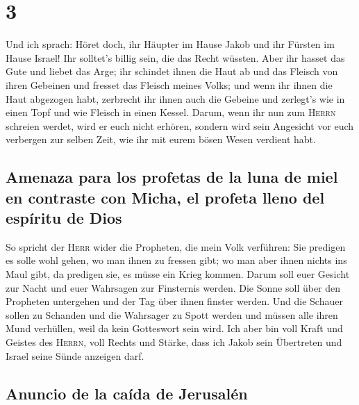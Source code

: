 \hypertarget{section-2}{%
\section{3}\label{section-2}}

 Und ich sprach: Höret doch, ihr Häupter im Hause Jakob
und ihr Fürsten im Hause Israel! Ihr solltet's billig sein, die das
Recht wüssten.  Aber ihr hasset das Gute und liebet das
Arge; ihr schindet ihnen die Haut ab und das Fleisch von ihren Gebeinen
 und fresset das Fleisch meines Volks; und wenn ihr ihnen
die Haut abgezogen habt, zerbrecht ihr ihnen auch die Gebeine und
zerlegt's wie in einen Topf und wie Fleisch in einen Kessel.
 Darum, wenn ihr nun zum \textsc{Herrn} schreien werdet,
wird er euch nicht erhören, sondern wird sein Angesicht vor euch
verbergen zur selben Zeit, wie ihr mit eurem bösen Wesen verdient habt.

\hypertarget{amenaza-para-los-profetas-de-la-luna-de-miel-en-contraste-con-micha-el-profeta-lleno-del-espuxedritu-de-dios}{%
\subsection{Amenaza para los profetas de la luna de miel en contraste
con Micha, el profeta lleno del espíritu de
Dios}\label{amenaza-para-los-profetas-de-la-luna-de-miel-en-contraste-con-micha-el-profeta-lleno-del-espuxedritu-de-dios}}

 So spricht der \textsc{Herr} wider die Propheten, die
mein Volk verführen: Sie predigen es solle wohl gehen, wo man ihnen zu
fressen gibt; wo man aber ihnen nichts ins Maul gibt, da predigen sie,
es müsse ein Krieg kommen.  Darum soll euer Gesicht zur
Nacht und euer Wahrsagen zur Finsternis werden. Die Sonne soll über den
Propheten untergehen und der Tag über ihnen finster werden.
 Und die Schauer sollen zu Schanden und die Wahrsager zu
Spott werden und müssen alle ihren Mund verhüllen, weil da kein
Gotteswort sein wird.  Ich aber bin voll Kraft und Geistes
des \textsc{Herrn}, voll Rechts und Stärke, dass ich Jakob sein
Übertreten und Israel seine Sünde anzeigen darf.

\hypertarget{anuncio-de-la-cauxedda-de-jerusaluxe9n}{%
\subsection{Anuncio de la caída de
Jerusalén}\label{anuncio-de-la-cauxedda-de-jerusaluxe9n}}

